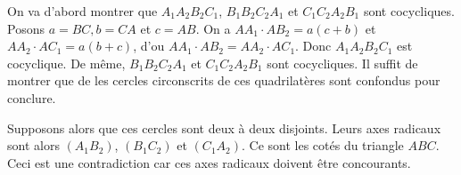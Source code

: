 \begin{sol}
\begin{center}
\end{center}

On va d'abord montrer que $A_1 A_2 B_2 C_1$, $B_1 B_2 C_2 A_1$ et $C_1 C_2 A_2 B_1$ sont cocycliques. Posons $a = BC, b = CA$ et $c = AB$. On a $AA_1 \cdot AB_2 = a\left(c+b\right)$ et $AA_2 \cdot AC_1 = a\left(b+c\right)$, d'ou $AA_1 \cdot AB_2 = AA_2 \cdot AC_1$. Donc $A_1 A_2 B_2 C_1$ est cocyclique. De  même, $B_1 B_2 C_2 A_1$ et $C_1 C_2 A_2 B_1$ sont cocycliques. Il suffit de montrer que de les cercles circonscrits de ces quadrilatères sont confondus pour conclure.

Supposons alors que ces cercles sont deux à deux disjoints. Leurs axes radicaux sont alors $\left(A_1 B_2\right)$, $\left(B_1 C_2\right)$ et $\left(C_1 A_2\right)$. Ce sont les cotés du triangle $ABC$. Ceci est une contradiction car ces axes radicaux doivent être concourants.
\end{sol}


